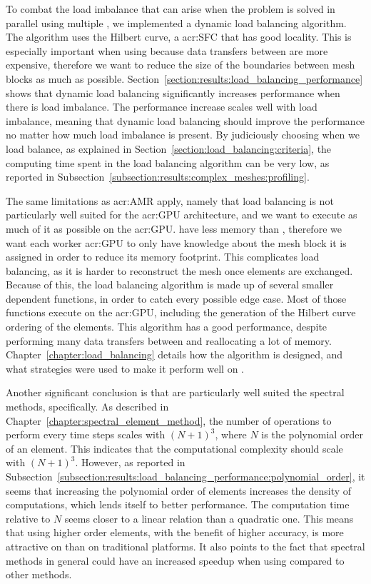 To combat the load imbalance that can arise when the problem is solved in parallel using multiple
, we implemented a dynamic load balancing algorithm. The algorithm uses the
Hilbert curve, a \acrlong{acr:SFC} that has good locality. This is especially important when using
 because data transfers between  are more expensive,
therefore we want to reduce the size of the boundaries between mesh blocks as much as possible.
Section~\ref{section:results:load_balancing_performance} shows that dynamic load balancing
significantly increases performance when there is load imbalance. The performance increase scales
well with load imbalance, meaning that dynamic load balancing should improve the performance no
matter how much load imbalance is present. By judiciously choosing when we load balance, as
explained in Section~\ref{section:load_balancing:criteria}, the computing time spent in the load
balancing algorithm can be very low, as reported in
Subsection~\ref{subsection:results:complex_meshes:profiling}. 

The same limitations as \acrshort{acr:AMR} apply, namely that load balancing is not particularly
well suited for the \acrshort{acr:GPU} architecture, and we want to execute as much of it as
possible on the \acrshort{acr:GPU}.  have less memory than ,
therefore we want each worker \acrshort{acr:GPU} to only have knowledge about the mesh block it is
assigned in order to reduce its memory footprint. This complicates load balancing, as it is harder
to reconstruct the mesh once elements are exchanged. Because of this, the load balancing algorithm
is made up of several smaller dependent functions, in order to catch every possible edge case. Most
of those functions execute on the \acrshort{acr:GPU}, including the generation of the Hilbert curve
ordering of the elements. This algorithm has a good performance, despite performing many data
transfers between  and reallocating a lot of memory.
Chapter~\ref{chapter:load_balancing} details how the algorithm is designed, and what strategies were
used to make it perform well on .

Another significant conclusion is that  are particularly well suited the
spectral methods, specifically. As described in Chapter~\ref{chapter:spectral_element_method}, the
number of operations to perform every time steps scales with \({\left( N + 1 \right)}^3\), where
\(N\) is the polynomial order of an element. This indicates that the computational complexity should
scale with \({\left( N + 1 \right)}^3\). However, as reported in
Subsection~\ref{subsection:results:load_balancing_performance:polynomial_order}, it seems that
increasing the polynomial order of elements increases the density of computations, which lends
itself to better performance. The computation time relative to \(N\) seems closer to a linear
relation than a quadratic one. This means that using higher order elements, with the benefit of
higher accuracy, is more attractive on  than on traditional platforms. It also
points to the fact that spectral methods in general could have an increased speedup when using
 compared to other methods.

